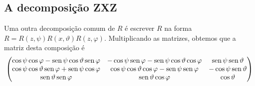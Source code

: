 \documentclass[12pt]{amsart}
\DeclareMathOperator{\sen}{\textrm{\rm sen}}
\theoremstyle{definition}
\begin{document}
\subsection{A decomposição ZXZ}
Uma outra decomposição comum de $R$ é escrever $R$ na forma $R=R(z,\psi)R(x,\vartheta)R(z,\varphi)$. 
Multiplicando as matrizes, obtemos que a matriz desta composição é 
\[
\begin{pmatrix} 
    \cos\psi\cos\varphi - \sen\psi\cos\vartheta\sen\varphi & -\cos\psi\sen\varphi - \sen\psi\cos\vartheta\cos\varphi   &                \sen\psi\sen\vartheta\\
\cos\psi\cos\vartheta\sen\varphi + \sen\psi\cos\varphi & \cos\psi\cos\vartheta\cos\varphi - \sen\psi\sen\varphi    &              -\cos\psi\sen\vartheta\\
\sen\vartheta\sen\varphi &                  \sen\vartheta\cos\varphi      &                  \cos\vartheta
\end{pmatrix}
\]
\end{document}
